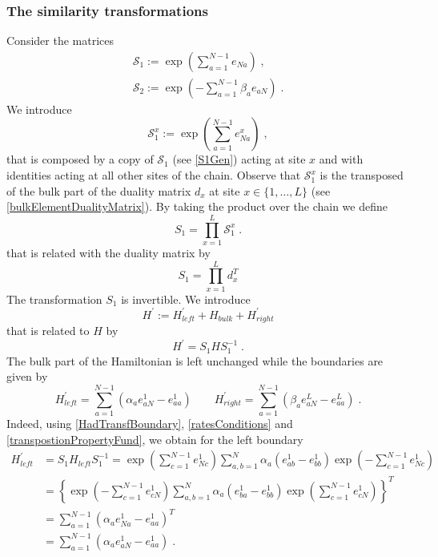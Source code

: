 \documentclass[10pt]{article}
\numberwithin{equation}{section}
\numberwithin{equation}{subsection}
\newcommand{\co}{\;,}
\newcommand{\dt}{\;.}
\begin{document}
\subsubsection{The similarity transformations}\label{subsectionSTransf}
Consider the matrices
\begin{align}
	\mathcal{S}_{1}:=\exp{\left(\sum_{a=1}^{N-1}e_{Na}\right)}\label{S1Gen}\co\\
	\mathcal{S}_{2}:=\exp{\left(-\sum_{a=1}^{N-1}\beta_{a}e_{aN}\right)}\dt\label{S2Gen}
\end{align}
We introduce
\begin{equation}\label{transformationV}
 \mathcal{S}_{1}^{x}:=\exp{\left(\sum_{a=1}^{N-1}e_{Na}^{x}\right)}\co %
\end{equation}
that is composed by a copy of $\mathcal{S}_{1}$ (see \eqref{S1Gen}) acting at site $x$ and with identities acting at all other sites of the chain. 
Observe that $\mathcal{S}_{1}^{x}$ is the transposed of the bulk part of the duality matrix $d_{x}$  at site $x\in \{1,\ldots,L\}$ (see \eqref{bulkElementDualityMatrix}). By taking the product over the chain we define
\begin{equation}\label{S1-Whole}
    S_{1}=\prod_{x=1}^{L}\mathcal{S}_{1}^{x}\dt
\end{equation}
that is related with the duality matrix by 
\begin{equation}
S_{1}=\prod_{x=1}^{L}d_{x}^{T}
\end{equation}
 The transformation $S_{1}$ is invertible. We introduce 
\begin{equation}\label{hatHamiltonian}
   H^{'}:=H^{'}_{left}+H_{bulk}+H^{'}_{right}
\end{equation}
that is related to $H$ by
\begin{equation}\label{similarV}
   H^{'}=S_{1}HS_{1}^{-1}\dt
\end{equation}
The bulk part of the Hamiltonian is left unchanged while the boundaries are given by 
\begin{equation}
	H^{'}_{left}=\sum_{a=1}^{N-1}\left(\alpha_{a}e_{aN}^{1}-e_{aa}^{1}\right)\qquad H^{'}_{right}=\sum_{a=1}^{N-1}\left(\beta_{a}e_{aN}^{L}-e_{aa}^{L}\right)\dt
\end{equation}
Indeed, using \eqref{HadTransfBoundary}, \eqref{ratesConditions} and \eqref{transpostionPropertyFund}, we obtain for the left boundary
\begin{equation}
	\begin{split}
		H_{left}^{'}&=S_{1}H_{left}S_{1}^{-1}=\exp{\left(\sum_{c=1}^{N-1}e_{Nc}^{1}\right)}\sum_{a,b=1}^{N}\alpha_{a}\left(e_{ab}^{1}-e_{bb}^{1}\right)\exp{\left(-\sum_{c=1}^{N-1}e_{Nc}^{1}\right)}
		\\&=
		\left\{\exp{\left(-\sum_{c=1}^{N-1}e_{cN}^{1}\right)}\sum_{a,b=1}^{N}\alpha_{a}\left(e_{ba}^{1}-e_{bb}^{1}\right)\exp{\left(\sum_{c=1}^{N-1}e_{cN}^{1}\right)}\right\}^{T}
		\\&=
		\sum_{a=1}^{N-1}\left(\alpha_{a}e_{Na}^{1}-e_{aa}^{1}\right)^{T}
		\\&=
		\sum_{a=1}^{N-1}\left(\alpha_{a}e_{aN}^{1}-e_{aa}^{1}\right)\dt
	\end{split}
\end{equation}
\end{document}
